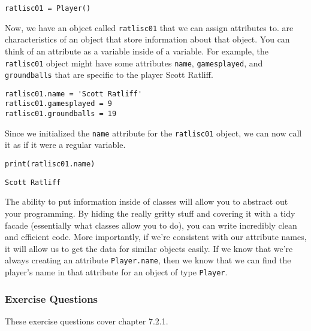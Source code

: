 \begin{lstlisting}[style=pippython]
ratlisc01 = Player()
\end{lstlisting}
Now, we have an object called \verb|ratlisc01| that we can assign attributes to.  are characteristics of an object that store information about that object. You can think of an attribute as a variable inside of a variable. For example, the \verb|ratlisc01| object might have some attributes \verb|name|, \verb|gamesplayed|, and \verb|groundballs| that are specific to the player Scott Ratliff.
\begin{lstlisting}[style=pippython]
ratlisc01.name = 'Scott Ratliff'
ratlisc01.gamesplayed = 9
ratlisc01.groundballs = 19
\end{lstlisting}
Since we initialized the \verb|name| attribute for the \verb|ratlisc01| object, we can now call it as if it were a regular variable.
\begin{lstlisting}[style=pippython]
print(ratlisc01.name)
\end{lstlisting}
\begin{lstlisting}[style=pippython]
Scott Ratliff
\end{lstlisting}
The ability to put information inside of classes will allow you to abstract out your programming. By hiding the really gritty stuff and covering it with a tidy facade (essentially what classes allow you to do), you can write incredibly clean and efficient code. More importantly, if we're consistent with our attribute names, it will allow us to get the data for similar objects easily. If we know that we're always creating an attribute \verb|Player.name|, then we know that we can find the player's name in that attribute for an object of type \verb|Player|.
\subsubsection*{Exercise Questions}
These exercise questions cover chapter 7.2.1.
\begin{Exercise}
\end{Exercise}
\begin{Exercise}
\end{Exercise}
\begin{Exercise}
\end{Exercise}

